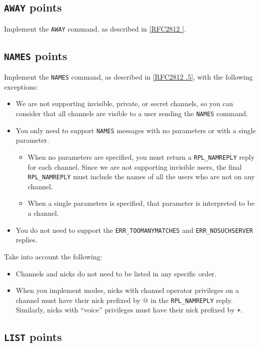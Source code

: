 \documentclass[10pt]{article}
\newcommand{\RFCsection}[2]{\href{http://tools.ietf.org/html/rfc#1\#section-#2}{[RFC#1 \textsection #2]}}
\newcommand{\points}[1]{{\sffamily\mdseries\guillemotleft #1 points\guillemotright{}}}
\begin{document}
\subsection{\texttt{AWAY} \points{5}}

Implement the \texttt{AWAY} command, as described in \RFCsection{2812}{4.1}. 


\subsection{\texttt{NAMES} \points{5}}

Implement the \texttt{NAMES} command, as described in \RFCsection{2812}{3.2.5}, with the following exceptions:

\begin{itemize}
\item We are not supporting invisible, private, or secret channels, so you can consider that all channels are visible to a user sending the \texttt{NAMES} command.
\item You only need to support \texttt{NAMES} messages with no parameters or with a single parameter.
\begin{itemize}
\item When no parameters are specified, you must return a \texttt{RPL\_NAMREPLY} reply for each channel. Since we are not supporting invisible users,
the final \texttt{RPL\_NAMREPLY} must include the names of all the users who are not on any channel.
\item When a single parameters is specified, that parameter is interpreted to be a channel.
\end{itemize}
\item You do not need to support the \texttt{ERR\_TOOMANYMATCHES} and \texttt{ERR\_NOSUCHSERVER} replies.
\end{itemize}

\noindent Take into account the following:

\begin{itemize}
\item Channels and nicks do not need to be listed in any specific order.
\item When you implement modes, nicks with channel operator privileges on a channel must have their nick prefixed by \texttt{$@$} in the \texttt{RPL\_NAMREPLY} reply. Similarly, nicks with ``voice'' privileges must have their nick prefixed by \texttt{+}.
\end{itemize}


\subsection{\texttt{LIST} \points{5}}
\end{document}

